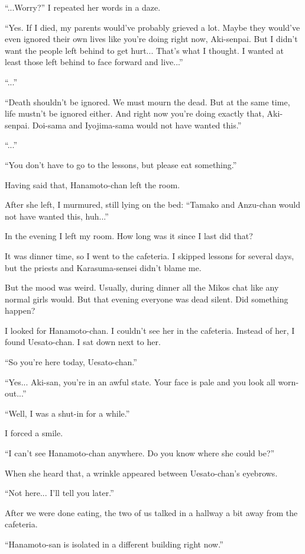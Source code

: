 ``...Worry?'' I repeated her words in a daze.

``Yes. If I died, my parents would've probably grieved a lot. Maybe they would've even ignored their own lives like you're doing right now, Aki-senpai. But I didn't want the people left behind to get hurt... That's what I thought. I wanted at least those left behind to face forward and live...''

``...''

``Death shouldn't be ignored. We must mourn the dead. But at the same time, life mustn't be ignored either. And right now you're doing exactly that, Aki-senpai. Doi-sama and Iyojima-sama would not have wanted this.''

``...''

``You don't have to go to the lessons, but please eat something.''

Having said that, Hanamoto-chan left the room.

After she left, I murmured, still lying on the bed: ``Tamako and Anzu-chan would not have wanted this, huh...''

In the evening I left my room. How long was it since I last did that?

It was dinner time, so I went to the cafeteria. I skipped lessons for several days, but the priests and Karasuma-sensei didn't blame me.

But the mood was weird. Usually, during dinner all the Mikos chat like any normal girls would. But that evening everyone was dead silent. Did something happen?

I looked for Hanamoto-chan. I couldn't see her in the cafeteria. Instead of her, I found Uesato-chan. I sat down next to her.

``So you're here today, Uesato-chan.''

``Yes... Aki-san, you're in an awful state. Your face is pale and you look all worn-out...''

``Well, I was a shut-in for a while.''

I forced a smile.

``I can't see Hanamoto-chan anywhere. Do you know where she could be?''

When she heard that, a wrinkle appeared between Uesato-chan's eyebrows.

``Not here... I'll tell you later.''

After we were done eating, the two of us talked in a hallway a bit away from the cafeteria.

``Hanamoto-san is isolated in a different building right now.''

